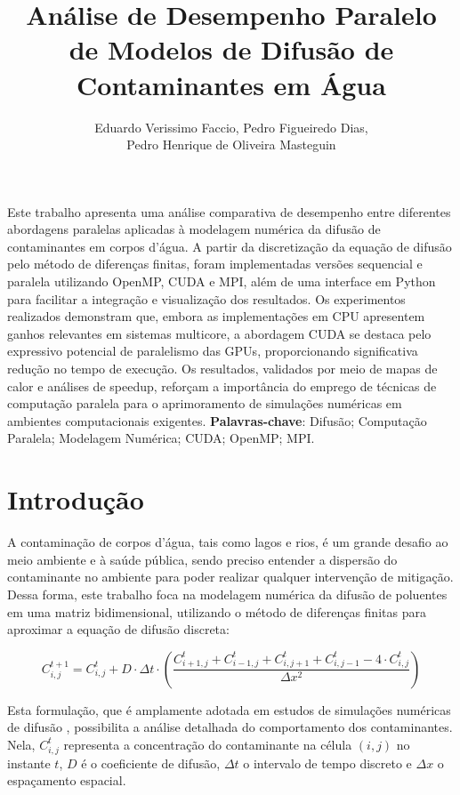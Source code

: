 \documentclass[12pt]{article}
\title{Análise de Desempenho Paralelo de Modelos de Difusão de Contaminantes em
  Água}
\author{Eduardo Verissimo Faccio, Pedro Figueiredo Dias, \\
  Pedro Henrique de Oliveira Masteguin}
\begin{document}
\maketitle

\begin{resumo}
  Este trabalho apresenta uma análise comparativa de desempenho entre diferentes abordagens paralelas
  aplicadas à modelagem numérica da difusão de contaminantes em corpos d'água. A partir da discretização
  da equação de difusão pelo método de diferenças finitas, foram implementadas versões sequencial e
  paralela utilizando OpenMP, CUDA e MPI, além de uma interface em Python para facilitar a integração e
  visualização dos resultados. Os experimentos realizados demonstram que, embora as implementações em CPU
  apresentem ganhos relevantes em sistemas multicore, a abordagem CUDA se destaca pelo expressivo potencial
  de paralelismo das GPUs, proporcionando significativa redução no tempo de execução. Os resultados,
  validados por meio de mapas de calor e análises de speedup, reforçam a importância do emprego de técnicas
  de computação paralela para o aprimoramento de simulações numéricas em ambientes computacionais exigentes.
  \textbf{Palavras-chave}: Difusão; Computação Paralela; Modelagem Numérica; CUDA; OpenMP; MPI.
\end{resumo}

\section{Introdução}

A contaminação de corpos d'água, tais como lagos e rios, é um grande desafio ao
meio ambiente e à saúde pública, sendo preciso entender a dispersão do
contaminante no ambiente para poder realizar qualquer intervenção de mitigação.
Dessa forma, este trabalho foca na modelagem numérica da difusão de poluentes
em uma matriz bidimensional, utilizando o método de diferenças finitas para
aproximar a equação de difusão discreta:

\begin{equation}
  C_{i,j}^{t+1} = C_{i,j}^t + D \cdot \Delta t \cdot \left( \frac{C_{i+1,j}^t +
    C_{i-1,j}^t + C_{i,j+1}^t + C_{i,j-1}^t - 4 \cdot C_{i,j}^t}{\Delta x^2}
  \right)
  \label{eq:Difusao}
\end{equation}

Esta formulação, que é amplamente adotada em estudos de simulações numéricas de
difusão \cite{crank1979mathematics}, possibilita a análise detalhada do
comportamento dos contaminantes. Nela, $C_{i,j}^t$ representa a concentração do
contaminante na célula $(i,j)$ no instante $t$, $D$ é o coeficiente de difusão,
$\Delta t$ o intervalo de tempo discreto e $\Delta x$ o espaçamento espacial.
\end{document}
